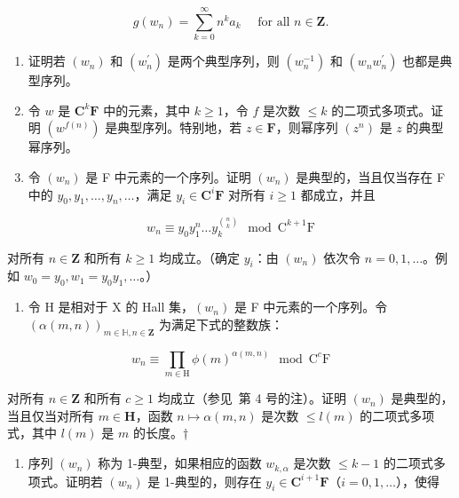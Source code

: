 \[
g (w _ {n}) = \sum_ {k = 0} ^ {\infty} n ^ {k} a _ {k} \quad \text { for   all } n \in \mathbf {Z}.
\]

\begin{enumerate}
\def\labelenumi{(\alph{enumi})}
\setcounter{enumi}{1}
\item
  证明若 \((w_{n})\) 和 \((w_{n}^{\prime})\) 是两个典型序列，则 \((w_{n}^{-1})\) 和 \((w_{n}w_{n}^{\prime})\) 也都是典型序列。
\item
  令 \(w\) 是 \(\mathbf{C}^k\mathbf{F}\) 中的元素，其中 \(k \geqslant 1\)，令 \(f\) 是次数 \(\leqslant k\) 的二项式多项式。证明 \((w^{f(n)})\) 是典型序列。特别地，若 \(z \in \mathbf{F}\)，则幂序列 \((z^n)\) 是 \(z\) 的典型幂序列。
\item
  令 \((w_{n})\) 是 F 中元素的一个序列。证明 \((w_{n})\) 是典型的，当且仅当存在 F 中的 \(y_{0}, y_{1}, \ldots, y_{n}, \ldots\)，满足 \(y_{i} \in \mathbf{C}^{i}\mathbf{F}\) 对所有 \(i \geqslant 1\) 都成立，并且
\end{enumerate}

\[
w _ {n} \equiv y _ {0} y _ {1} ^ {n} \dots y _ {k} ^ {\binom {n} {k}} \mod \mathrm{C} ^ {k + 1} \mathrm{F}
\]

对所有 \(n \in \mathbf{Z}\) 和所有 \(k \geqslant 1\) 均成立。（确定 \(y_{i}\)：由 \((w_{n})\) 依次令 \(n = 0, 1, \ldots\)。例如 \(w_{0} = y_{0}, w_{1} = y_{0}y_{1}, \ldots\)。）

\begin{enumerate}
\def\labelenumi{(\alph{enumi})}
\setcounter{enumi}{4}
\tightlist
\item
  令 H 是相对于 X 的 Hall 集，\((w_{n})\) 是 F 中元素的一个序列。令 \((\alpha(m,n))_{m\in\mathbb{H},n\in\mathbf{Z}}\) 为满足下式的整数族：
\end{enumerate}

\[
w _ {n} \equiv \prod_ {m \in \mathrm{H}} \phi (m) ^ {\alpha (m, n)} \mod \mathrm{C} ^ {c} \mathrm{F}
\]

对所有 \(n \in \mathbf{Z}\) 和所有 \(c \geqslant 1\) 均成立（参见~第 4 号的注）。证明 \((w_n)\) 是典型的，当且仅当对所有 \(m \in \mathbf{H}\)，函数 \(n \mapsto \alpha(m, n)\) 是次数 \(\leqslant l(m)\) 的二项式多项式，其中 \(l(m)\) 是 \(m\) 的长度。†

\begin{enumerate}
\def\labelenumi{(\alph{enumi})}
\setcounter{enumi}{5}
\tightlist
\item
  序列 \((w_{n})\) 称为 1-典型，如果相应的函数 \(w_{k,\alpha}\) 是次数 \(\leqslant k - 1\) 的二项式多项式。证明若 \((w_{n})\) 是 1-典型的，则存在 \(y_{i} \in \mathbf{C}^{i + 1}\mathbf{F}\)（\(i = 0, 1, \ldots\)），使得
\end{enumerate}


